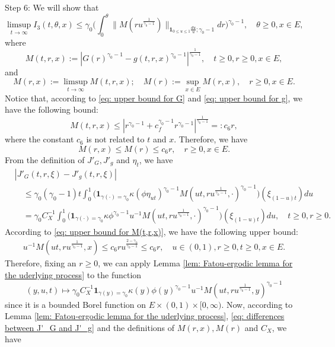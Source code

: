 \documentclass[12pt, a4paper]{amsart}
\theoremstyle{definition}
\numberwithin{equation}{section}
\begin{document}
	Step 6: We will show that
\[
	\limsup_{t\to \infty} I_3(t,\theta,x)
	\leq \gamma_0 \Big(  \int_0^\theta  \| M(r u^{\frac{1}{\gamma_0 - 1}}) \|_{\mathbf 1_{0\leq u\leq 1}\frac{du}{u};\gamma_0 - 1}  dr\Big)^{\gamma_0 - 1},
	\quad \theta \geq 0, x\in E,
\]
	where
\[
	M(t,r,x)
	:= |G(r)^{\gamma_0 - 1} - g(t,r,x)^{\gamma_0 - 1}|^{\frac{1}{\gamma_0 - 1}},
	\quad t\geq 0, r\geq 0, x\in E,
\]
	and
\[
	M(r,x)
	:= \limsup_{t\to \infty} M(t,r,x);
	\quad M(r):= \sup_{x\in E} M(r,x),
	\quad r\geq 0, x\in E.
\]
	Notice that,
	according to \eqref{eq: upper bound for G} and \eqref{eq: upper bound for g}, we have the following bound:
\[\label{eq: upper bound for M(t,r,x)}
	M(t,r,x)
	\leq |r^{\gamma_0 - 1} + c_f^{\gamma_0 - 1} r^{\gamma_0 - 1} | ^{\frac{1}{\gamma_0 - 1}}
	=: c_6 r,
\]
	where the constant $c_6$ is not related to $t$ and $x$.
	Therefore, we have
\[
	M(r,x)
	\leq M(r)
	\leq c_6 r,
	\quad r\geq 0, x\in E.
\]	
	From the definition of $J'_G, J'_g$ and $\eta_t$, we have
\[\label{eq: differences between J'_G and J'_g}\begin{split}
	&|J'_G(t,r,\xi) - J'_g(t,r,\xi)|
	\\&\quad \leq \gamma_0(\gamma_0 - 1) t \int_0^1 \big( \mathbf 1_{\gamma(\cdot) = \gamma_0} \kappa (\phi \eta_{ut})^{\gamma_0 - 1} M(ut,ru^{\frac{1}{\gamma_0 - 1}},\cdot)^{\gamma_0 - 1}\big)(\xi_{(1-u)t}) du
	\\&\quad = \gamma_0 C_X^{-1}\int_0^1 \big( \mathbf 1_{\gamma(\cdot) = \gamma_0} \kappa  \phi^{\gamma_0 - 1}  u^{-1} M(ut,ru^{\frac{1}{\gamma_0 - 1}},\cdot)^{\gamma_0 - 1}\big)(\xi_{(1-u)t}) du,
	\quad t\geq 0, r\geq 0.
\end{split}\]
	According to \eqref{eq: upper bound for M(t,r,x)}, we have the following upper bound:
\[\begin{split}
		u^{-1} M(ut,ru^{\frac{1}{\gamma_0 - 1}}, x)
		\leq c_6 ru^{\frac{2-\gamma_0}{\gamma_0 - 1}}
		\leq c_6 r,
		\quad u\in (0,1), r\geq 0, t\geq 0, x\in E.
\end{split}\]
	Therefore, fixing an $r\geq 0$, we can apply Lemma \ref{lem: Fatou-ergodic lemma for the uderlying process} to the function
\[
	(y,u,t)
	\mapsto \gamma_0 C_X^{-1}\mathbf 1_{\gamma(y) = \gamma_0} \kappa(y)  \phi(y)^{\gamma_0 - 1}  u^{-1} M(ut,ru^{\frac{1}{\gamma_0 - 1}},y)^{\gamma_0 - 1}
\]
	since it is a bounded Borel function on $E\times (0,1) \times [0,\infty)$.
	Now, according to Lemma \ref{lem: Fatou-ergodic lemma for the uderlying process},  \eqref{eq: differences between J'_G and J'_g} and 
    the definitions of  
$M(r,x), M(r)$ and $C_X$, we have
\end{document}
